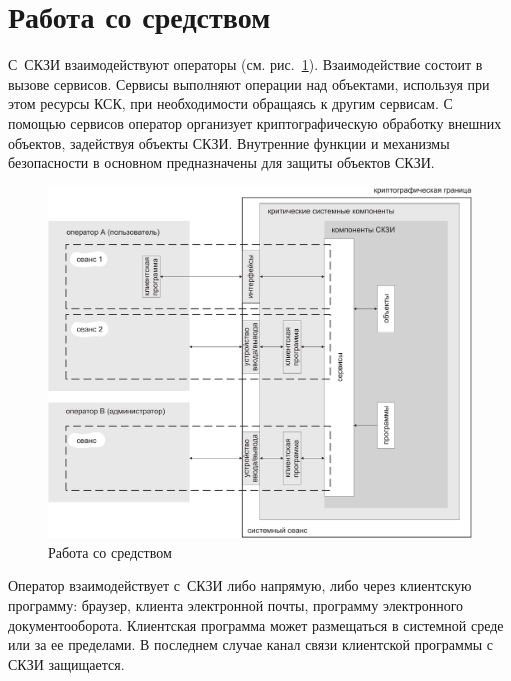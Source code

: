 \section{Работа со средством}\label{COMMON.Overview}


С~СКЗИ взаимодействуют операторы (см. рис.~\ref{Fig.COMMON.Sessions}).
%
Взаимодействие состоит в вызове сервисов.
%
Сервисы выполняют операции над объектами, используя при этом ресурсы КСК,
при необходимости обращаясь к другим сервисам.
%
С помощью сервисов оператор организует криптографическую
обработку внешних объектов, задействуя объекты СКЗИ.
%
Внутренние функции и механизмы безопасности в основном предназначены
для защиты объектов СКЗИ.

\begin{figure}[bht]
\begin{center}
\includegraphics[width=16.5cm]{../figs/sessions}
\end{center}
\caption{Работа со средством}\label{Fig.COMMON.Sessions}
\end{figure}


Оператор взаимодействует с~СКЗИ либо напрямую, 
либо через клиентскую программу: браузер, клиента электронной почты, 
программу электронного документооборота.
%
Клиентская программа может размещаться в системной среде 
или за ее пределами. 
%
В последнем случае канал связи клиентской программы с СКЗИ защищается. 

